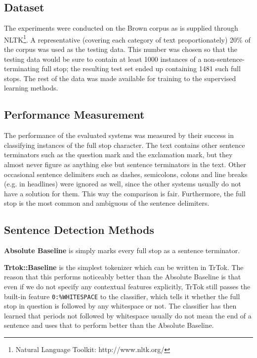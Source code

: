 \subsection{Dataset}

The experiments were conducted on the Brown corpus \cite{data-brown}
as is supplied through NLTK\footnote{Natural Language Toolkit:
http://www.nltk.org/}. A representative (covering each category of
text proportionately) 20\% of the corpus was used as the testing data.
This number was chosen so that the testing data would be sure to
contain at least 1000 instances of a non-sentence-terminating full
stop; the resulting test set ended up containing 1481 such full stops.
The rest of the data was made available for training to the supervised
learning methods.

\subsection{Performance Measurement}

The performance of the evaluated systems was measured by their success
in classifying instances of the full stop character. The text contains
other sentence terminators such as the question mark and the
exclamation mark, but they almost never figure as anything else but
sentence terminators in the text. Other occasional sentence delimiters
such as dashes, semicolons, colons and line breaks (e.g. in headlines)
were ignored as well, since the other systems usually do not have a
solution for them. This way the comparison is fair. Furthermore, the
full stop is the most common and ambiguous of the sentence delimiters.

\subsection{Sentence Detection Methods}

\textbf{Absolute Baseline} is simply marks every full stop as a
sentence terminator.

\textbf{Trtok::Baseline} is the simplest tokenizer which can be
written in TrTok. The reason that this performs noticeably better than
the Absolute Baseline is that even if we do not specify any contextual
features explicitly, TrTok still passes the built-in feature
\texttt{0:\%WHITESPACE} to the classifier, which tells it whether the
full stop in question is followed by any whitespace or not. The
classifier has then learned that periods not followed by whitespace
usually do not mean the end of a sentence and uses that to perform
better than the Absolute Baseline.

